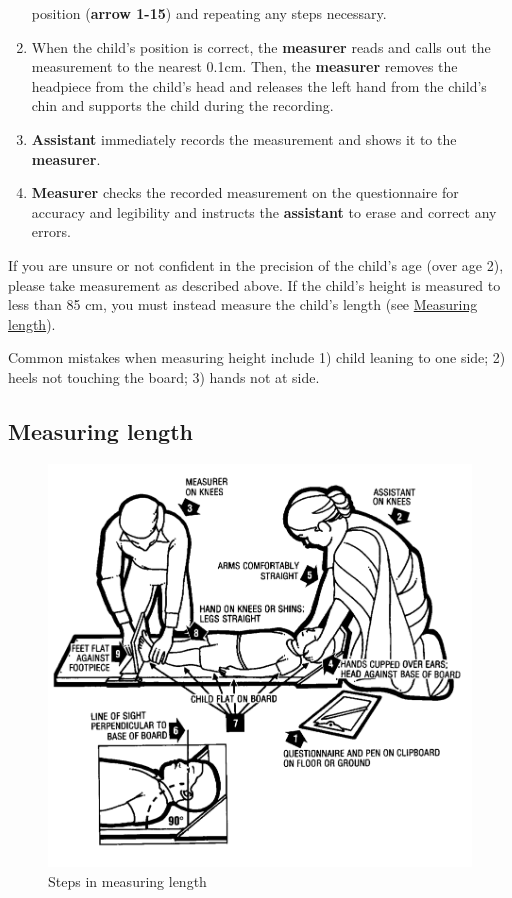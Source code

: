 \documentclass[12pt,]{book}
\theoremstyle{definition}
\theoremstyle{definition}
\theoremstyle{definition}
\theoremstyle{remark}
\let\BeginKnitrBlock\begin \let\EndKnitrBlock\end
\begin{document}
\begin{enumerate}
  position (\textbf{arrow 1-15}) and repeating any steps necessary.
\item
  When the child's position is correct, the \textbf{measurer} reads and
  calls out the measurement to the nearest 0.1cm. Then, the
  \textbf{measurer} removes the headpiece from the child's head and
  releases the left hand from the child's chin and supports the child
  during the recording.
\item
  \textbf{Assistant} immediately records the measurement and shows it to
  the \textbf{measurer}.
\item
  \textbf{Measurer} checks the recorded measurement on the questionnaire
  for accuracy and legibility and instructs the \textbf{assistant} to
  erase and correct any errors.
\end{enumerate}

\BeginKnitrBlock{rmdnote}
If you are unsure or not confident in the precision of the child's age
(over age 2), please take measurement as described above. If the child's
height is measured to less than 85 cm, you must instead measure the
child's length (see \protect\hyperlink{measuring-length}{Measuring
length}).
\EndKnitrBlock{rmdnote}

\BeginKnitrBlock{rmdwarning}
Common mistakes when measuring height include 1) child leaning to one
side; 2) heels not touching the board; 3) hands not at side.
\EndKnitrBlock{rmdwarning}

\hypertarget{measuring-length}{%
\subsection{Measuring length}\label{measuring-length}}

\begin{figure}

{\centering \includegraphics[width=12.46in]{images/length} 

}

\caption{Steps in measuring length}\label{fig:height07}
\end{figure}
\end{document}
